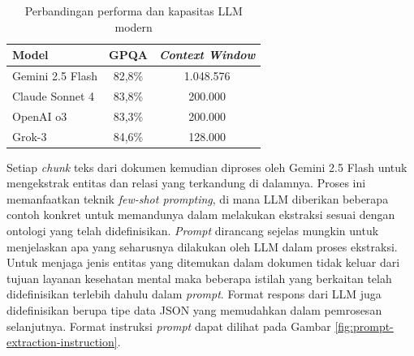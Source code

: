 \begin{table}[ht]
	\centering
	\caption{Perbandingan performa dan kapasitas LLM modern \cite{LLMStats}}
	\label{tab:llm-comparison}
	\begin{tabular}{|l|c|c|}
		\hline
		\textbf{Model}   & \textbf{GPQA} & \textbf{\textit{Context Window}} \\
		\hline \hline
		Gemini 2.5 Flash & 82,8\%        & 1.048.576                        \\
		\hline
		Claude Sonnet 4  & 83,8\%        & 200.000                          \\
		\hline
		OpenAI o3        & 83,3\%        & 200.000                          \\
		\hline
		Grok-3           & 84,6\%        & 128.000                          \\
		\hline
	\end{tabular}
\end{table}

\pagebreak
Setiap \textit{chunk} teks dari dokumen kemudian diproses oleh Gemini 2.5 Flash untuk mengekstrak entitas dan relasi yang terkandung di dalamnya.
Proses ini memanfaatkan teknik \textit{few-shot prompting}, di mana LLM diberikan beberapa contoh konkret untuk memandunya dalam melakukan ekstraksi sesuai dengan ontologi yang telah didefinisikan.
\textit{Prompt} dirancang sejelas mungkin untuk menjelaskan apa yang seharusnya dilakukan oleh LLM dalam proses ekstraksi.
Untuk menjaga jenis entitas yang ditemukan dalam dokumen tidak keluar dari tujuan layanan kesehatan mental maka beberapa istilah yang berkaitan telah didefinisikan terlebih dahulu dalam \textit{prompt}.
Format respons dari LLM juga didefinisikan berupa tipe data JSON yang memudahkan dalam pemrosesan selanjutnya. Format instruksi \textit{prompt} dapat dilihat pada Gambar \ref{fig:prompt-extraction-instruction}.

